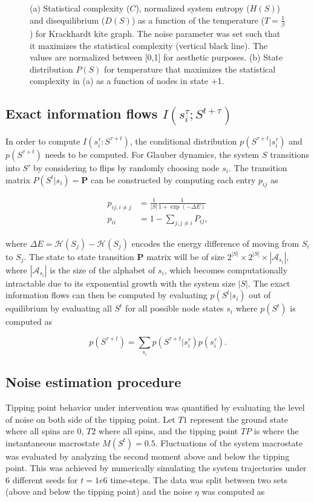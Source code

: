 \documentclass[a4paper, 11pt, twocolumn]{article}
\begin{document}
\begin{figure}[htbp]
\caption{\label{fig:stat_compl}(a) Statistical complexity (\(C\)), normalized system entropy (\(H(S)\)) and disequilibrium (\(D(S)\)) as a function of the temperature (\(T = \frac{1}{\beta}\)) for Krackhardt kite graph. The noise parameter was set such that it maximizes the statistical complexity (vertical black line). The values are normalized between [0,1] for aesthetic purposes. (b) State distribution \(P(S)\) for temperature that maximizes the statistical complexity in (a) as a function of nodes in state +1.}
\end{figure}

\subsection{Exact information flows \(I(s_i^{\tau} ; S^{t + \tau})\)}
\label{sec:org59af222}
In  order  to  compute  \(I(s_i^{\tau}  :  S^{\tau + t})\),  the
conditional  distribution \(p(S^{\tau  +  t}  | s_i^{\tau})\)  and
\(p(S^{\tau + t})\) needs to  be computed. For Glauber dynamics,
the system  \(S\) transitions into \(S'\)  by considering to
flips  by randomly  choosing  node  \(s_i\). The  transition
matrix \(P(S^t |  s_i) = \textbf{P}\) can  be constructed by
computing each entry \(p_{ij}\) as

\[\label{eq:glauber}
\begin{split}
p_{ij, i \neq j} &= \frac{1}{|S|} \frac{1}{ 1 + \exp (-\Delta E) }\\
p_{ii} &= 1 - \sum_{j, j \neq i} P_{ij},
\end{split}\]

where \(\Delta E =  \mathcal{H}(S_j) - \mathcal{H}(S_j)\) encodes
the energy difference of moving from \(S_i\) to \(S_j\). The
state to  state transition \(\textbf{P}\) matrix  will be of
size  \(2^{|S|}  \times  2^{|S|} \times  |\mathcal{A}_{s_i}|\),  where
\(|\mathcal{A}_{s_i}|\)  is  the  size of  the  alphabet  of
\(s_i\),  which becomes  computationally intractable  due to
its  exponential growth  with the  system size  \(|S|\). The
exact information  flows can then be  computed by evaluating
\(p(S^t  |  s_i)\)  out  of equilibrium  by  evaluating  all
\(S^t\)  for   all  possible   node  states   \(s_i\)  where
\(p(S^t)\) is computed as

\[p(S^{\tau + t}) = \sum_{s_i} p(S^{\tau + t} | s_i^{\tau} ) p(s_i^{\tau}).\]

\subsection{Noise estimation procedure}
\label{sec:orgc093508}
Tipping point behavior under intervention was quantified by evaluating
the level of noise on both side of the tipping point. Let \(T1\)
represent the ground state where all spins are 0, \(T2\) where all
spins, and the tipping point \(TP\) is where the instantaneous
macrostate \(M(S^t) = 0.5\). Fluctuations of the system macrostate was
evaluated by analyzing the second moment above and below the tipping
point. This was achieved by numerically simulating the system
trajectories under 6 different seeds for \(t = 1e6\) time-steps. The
data was split between two sets (above and below the tipping point) and
the noise \(\eta\) was computed as
\end{document}
